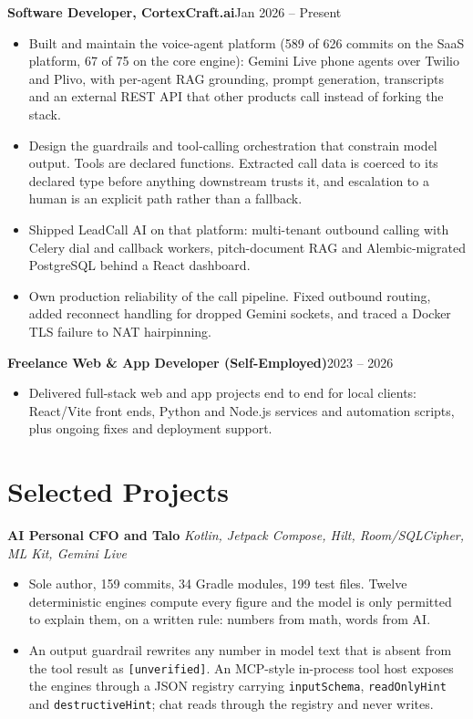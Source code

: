 \documentclass[10pt,a4paper]{article}
\newcommand{\entry}[2]{\textbf{#1}\hfill{#2}\par}
\begin{document}
\entry{Software Developer, CortexCraft.ai}{Jan 2026 -- Present}
\begin{itemize}
  \item Built and maintain the voice-agent platform (589 of 626 commits on the SaaS platform, 67 of 75
        on the core engine): Gemini Live phone agents over Twilio and Plivo, with per-agent RAG
        grounding, prompt generation, transcripts and an external REST API that other products call
        instead of forking the stack.
  \item Design the guardrails and tool-calling orchestration that constrain model output. Tools are
        declared functions. Extracted call data is coerced to its declared type before anything
        downstream trusts it, and escalation to a human is an explicit path rather than a fallback.
  \item Shipped LeadCall AI on that platform: multi-tenant outbound calling with Celery dial and
        callback workers, pitch-document RAG and Alembic-migrated PostgreSQL behind a React dashboard.
  \item Own production reliability of the call pipeline. Fixed outbound routing, added reconnect
        handling for dropped Gemini sockets, and traced a Docker TLS failure to NAT hairpinning.
\end{itemize}

\vspace{1pt}
\entry{Freelance Web \& App Developer (Self-Employed)}{2023 -- 2026}
\begin{itemize}
  \item Delivered full-stack web and app projects end to end for local clients: React/Vite front ends,
        Python and Node.js services and automation scripts, plus ongoing fixes and deployment support.
\end{itemize}

\section{Selected Projects}

\textbf{AI Personal CFO and Talo} \textit{Kotlin, Jetpack Compose, Hilt, Room/SQLCipher, ML Kit, Gemini Live}
\begin{itemize}
  \item Sole author, 159 commits, 34 Gradle modules, 199 test files. Twelve deterministic engines
        compute every figure and the model is only permitted to explain them, on a written rule:
        numbers from math, words from AI.
  \item An output guardrail rewrites any number in model text that is absent from the tool result as
        \texttt{[unverified]}. An MCP-style in-process tool host exposes the engines through a JSON
        registry carrying \texttt{inputSchema}, \texttt{readOnlyHint} and \texttt{destructiveHint};
        chat reads through the registry and never writes.
\end{itemize}
\end{document}
